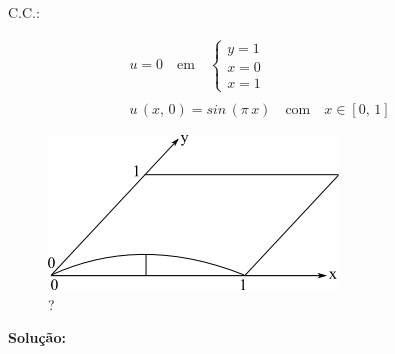C.C.:

\[
\begin{array}{l}
 u = 0 \quad \mbox{em} \quad
 \left\{
 \begin{array}{l}
  y = 1 \\
  x = 0 \\
  x = 1
 \end{array} \right. \\
 \\
 u\,(x,\,0) = sin\,(\pi \, x) \quad \mbox{com} \quad x \in [0,\,1]
\end{array}
\]

\begin{figure}[htb]
 \centering
 \includegraphics[scale=1.0]{capitulos/capitulo3/figuras/aprox_der_par_dif_fin1.png}
 \caption{?}
 \label{fig:aprox_der_par_dif_fin1}
\end{figure}

\textbf{Solução:}

